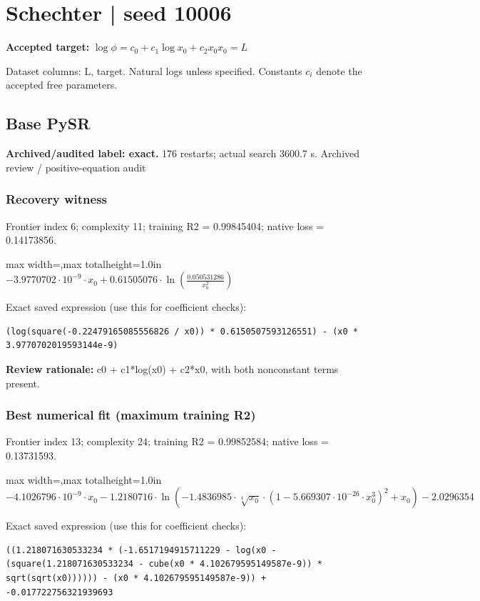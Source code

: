 \documentclass[10pt,letterpaper,landscape]{article}
\begin{document}
\section*{Schechter | seed 10006}
\textbf{Accepted target:} $\displaystyle \log\phi=c_0+c_1\log x_0+c_2x_0$\hfill $x_0=L$\par
{\small Dataset columns: L, target. Natural logs unless specified. Constants $c_i$ denote the accepted free parameters.}\par\medskip
\begin{minipage}[t]{0.485\textwidth}
\subsection*{Base PySR}
\textbf{Archived/audited label: exact.} 176 restarts; actual search 3600.7 s.
{\small Archived review / positive-equation audit}
\subsubsection*{Recovery witness}
Frontier index 6; complexity 11; training R2 = 0.99845404; native loss = 0.14173856.
\begin{center}\begin{adjustbox}{max width=\linewidth,max totalheight=1.0in}$\displaystyle - 3.9770702 \cdot 10^{-9} \cdot x_{0} + 0.61505076 \cdot \ln{\left(\frac{0.050531286}{x_{0}^{2}} \right)}$\end{adjustbox}\end{center}
{\scriptsize Exact saved expression (use this for coefficient checks):}
\begin{lstlisting}
(log(square(-0.22479165085556826 / x0)) * 0.6150507593126551) - (x0 * 3.9770702019593144e-9)
\end{lstlisting}
{\small\textbf{Review rationale:} c0 + c1*log(x0) + c2*x0, with both nonconstant terms present.}
\subsubsection*{Best numerical fit (maximum training R2)}
Frontier index 13; complexity 24; training R2 = 0.99852584; native loss = 0.13731593.
\begin{center}\begin{adjustbox}{max width=\linewidth,max totalheight=1.0in}$\displaystyle - 4.1026796 \cdot 10^{-9} \cdot x_{0} - 1.2180716 \cdot \ln{\left(- 1.4836985 \cdot \sqrt[4]{x_{0}} \cdot \left(1 - 5.669307 \cdot 10^{-26} \cdot x_{0}^{3}\right)^{2} + x_{0} \right)} - 2.0296354$\end{adjustbox}\end{center}
{\scriptsize Exact saved expression (use this for coefficient checks):}
\begin{lstlisting}
((1.218071630533234 * (-1.6517194915711229 - log(x0 - (square(1.218071630533234 - cube(x0 * 4.102679595149587e-9)) * sqrt(sqrt(x0)))))) - (x0 * 4.102679595149587e-9)) + -0.017722756321939693
\end{lstlisting}
\end{minipage}\hfill
\end{document}
